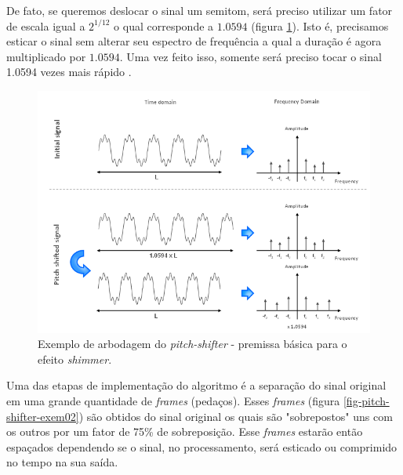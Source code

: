 				De fato, se queremos deslocar o sinal um semitom, será preciso utilizar um fator de escala igual a $2^{1/12}$ o qual corresponde a $1.0594$ (figura \ref{fig-pitch-shifter-exem01}). Isto é, precisamos esticar o sinal sem alterar seu espectro de frequência a qual a duração é agora multiplicado por $1.0594$. Uma vez feito isso, somente será preciso tocar o sinal 1.0594 vezes mais rápido \cite{Demers2009}.
				
				\begin{figure}[!ht]
					\centering
					\includegraphics[scale=0.5]{./figuras/pitch-shifter-exem1.PNG}
					\caption{Exemplo de arbodagem do \textit{pitch-shifter} - premissa básica para o efeito \textit{shimmer}.}
					\label{fig-pitch-shifter-exem01}
				\end{figure}
				
				Uma das etapas de implementação do algoritmo é a separação do sinal original em uma grande quantidade de \textit{frames} (pedaços). Esses \textit{frames} (figura \ref{fig-pitch-shifter-exem02}) são obtidos do sinal original os quais são "sobrepostos" uns com os outros por um fator de 75\% de sobreposição. Esse \textit{frames} estarão então espaçados dependendo se o sinal, no processamento, será esticado ou comprimido no tempo na sua saída.
				
